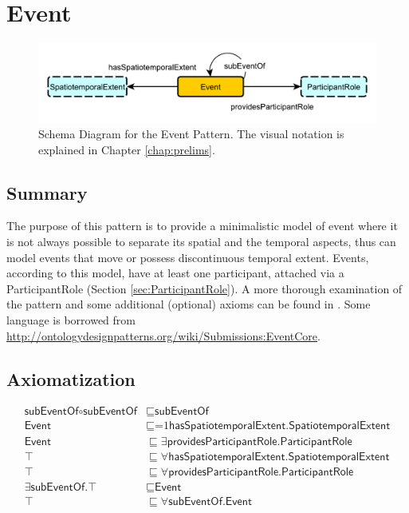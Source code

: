 \section{Event}
\label{sec:Event}
\begin{figure}[h!]
\begin{center}
\includegraphics[width=.8\textwidth]{figures/event}
\end{center}
\caption{Schema Diagram for the Event Pattern. The visual notation is explained in Chapter \ref{chap:prelims}.}
\label{fig:Event}
\end{figure}
\subsection{Summary}
\label{sum:Event}
The purpose of this pattern is to provide a minimalistic model of event where it is not always possible to separate its spatial and the temporal aspects, thus can model events that move or possess discontinuous temporal extent. Events, according to this model, have at least one participant, attached via a \textsf{ParticipantRole} (Section \ref{sec:ParticipantRole}). A more thorough examination of the pattern and some additional (optional) axioms can be found in \cite{event}. Some language is borrowed from \url{http://ontologydesignpatterns.org/wiki/Submissions:EventCore}.

\subsection{Axiomatization}
\label{axs:Event}
\begin{align}
\textsf{subEventOf} \circ \textsf{subEventOf} &\sqsubseteq \textsf{subEventOf} \\
\textsf{Event} &\sqsubseteq \text{=1} \textsf{hasSpatiotemporalExtent.SpatiotemporalExtent} \\
\textsf{Event} &\sqsubseteq \exists \textsf{providesParticipantRole.ParticipantRole} \\
\top &\sqsubseteq \forall \textsf{hasSpatiotemporalExtent.SpatiotemporalExtent} \\
\top &\sqsubseteq \forall \textsf{providesParticipantRole.ParticipantRole} \\
\exists \textsf{subEventOf.}\top &\sqsubseteq \textsf{Event} \\
\top &\sqsubseteq \forall \textsf{subEventOf.Event}
\end{align}

